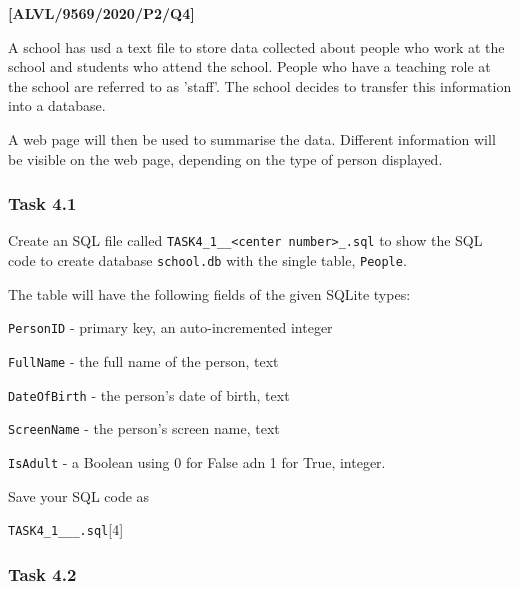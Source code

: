 \begin{onehalfspace}
\item \textbf{{[}ALVL/9569/2020/P2/Q4{]} }
\end{onehalfspace}

\begin{onehalfspace}
\noindent A school has usd a text file to store data collected about
people who work at the school and students who attend the school.
People who have a teaching role at the school are referred to as 'staff'.
The school decides to transfer this information into a database.

\noindent A web page will then be used to summarise the data. Different
information will be visible on the web page, depending on the type
of person displayed.
\end{onehalfspace}
\begin{onehalfspace}

\subsubsection*{Task 4.1}
\end{onehalfspace}

\begin{onehalfspace}
\noindent Create an SQL file called \texttt{TASK4\_1\_<your name>\_<center
number>\_<index number>.sql} to show the SQL code to create database
\texttt{school.db} with the single table, \texttt{People}.

\noindent The table will have the following fields of the given SQLite
types:
\end{onehalfspace}
\begin{itemize}
\begin{onehalfspace}
\item \texttt{PersonID} - primary key, an auto-incremented integer
\item \texttt{FullName} - the full name of the person, text
\item \texttt{DateOfBirth} - the person's date of birth, text
\item \texttt{ScreenName} - the person's screen name, text
\item \texttt{IsAdult} - a Boolean using 0 for False adn 1 for True, integer.
\end{onehalfspace}
\end{itemize}
\begin{onehalfspace}
\noindent Save your SQL code as

\noindent \texttt{TASK4\_1\_<your name>\_<center number>\_<index number>.sql}\hfill{}{[}4{]}
\end{onehalfspace}
\begin{onehalfspace}

\subsubsection*{Task 4.2}
\end{onehalfspace}

